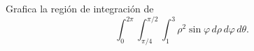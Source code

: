 Grafica la región de integración de
\[
\int_0^{2\pi}\int_{\pi/4}^{\pi/2}\int_1^3
\rho^2\sin\varphi\,d\rho\,d\varphi\,d\theta.
\]

